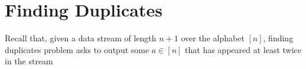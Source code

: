 \documentclass[9pt,letterpaper]{article}
\theoremstyle{remark}
\DeclareMathOperator{\polylog}{polylog}
\begin{document}
%
%
\section{Finding Duplicates}\label{sec:duplicates}
Recall that, given a data stream of length $n+1$ over the alphabet $[n]$, finding
duplicates problem asks to output some $a\in[n]$ that has appeared
at least twice in the stream

\end{document}
